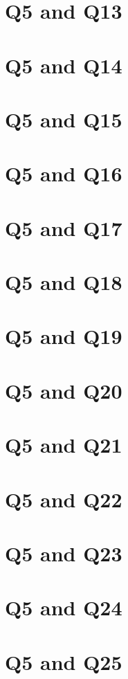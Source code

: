 \documentclass{report}
\begin{document}
\section{Q5 and Q13}\clearpage
\section{Q5 and Q14}\clearpage
\section{Q5 and Q15}\clearpage
\section{Q5 and Q16}\clearpage
\section{Q5 and Q17}\clearpage
\section{Q5 and Q18}\clearpage
\section{Q5 and Q19}\clearpage
\section{Q5 and Q20}\clearpage
\section{Q5 and Q21}\clearpage
\section{Q5 and Q22}\clearpage
\section{Q5 and Q23}\clearpage
\section{Q5 and Q24}\clearpage
\section{Q5 and Q25}\clearpage
\end{document}

